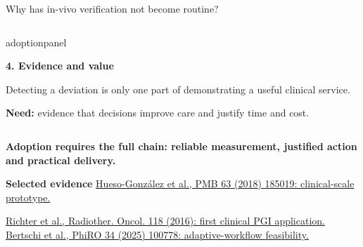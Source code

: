 \documentclass[aspectratio=169,11pt]{beamer}
\begin{document}
\begin{frame}{Why has in-vivo verification not become routine?}
\begin{columns}[T,onlytextwidth]
\begin{beamercolorbox}[sep=6pt,wd=\linewidth]{adoptionpanel}
\begin{minipage}[t][1.65cm][t]{\linewidth}\raggedright
{\footnotesize\bfseries\color{crBlue}4. Evidence and value\par}
\vspace{0.07cm}
{\scriptsize
Detecting a deviation is only one part of demonstrating a useful clinical service.\par
\vspace{0.08cm}
\textbf{Need:} evidence that decisions improve care and justify time and cost.\par}
\end{minipage}
\end{beamercolorbox}
\end{columns}

\vspace{0.16cm}
{\footnotesize\bfseries\color{darkred}
Adoption requires the full chain: reliable measurement, justified action and practical delivery.\par}

\vfill
{\fontsize{6}{7}\selectfont\color{crGrey}\raggedright
\textbf{Selected evidence}\quad
\href{https://doi.org/10.1088/1361-6560/aad513}
{Hueso-Gonz\'alez et al., PMB 63 (2018) 185019: clinical-scale prototype.}\par
\href{https://doi.org/10.1016/j.radonc.2016.01.004}
{Richter et al., Radiother. Oncol. 118 (2016): first clinical PGI application.}\quad
\href{https://doi.org/10.1016/j.phro.2025.100778}
{Bertschi et al., PhiRO 34 (2025) 100778: adaptive-workflow feasibility.}\par
}
\end{frame}
\end{document}
